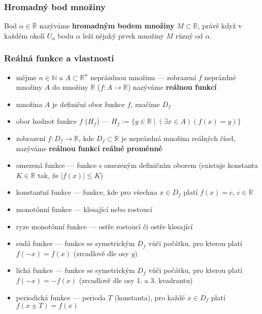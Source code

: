 \subsubsection*{Hromadný bod množiny}
Bod $\alpha \in \overline{\mathbb{R}}$ nazýváme \textbf{hromadným bodem množiny} $M \subset \mathbb{R}$, právě když v každém okolí $U_\alpha$ bodu $\alpha$ leží nějaký prvek množiny $M$ různý od $\alpha$.

\subsubsection*{Reálná funkce a vlastnosti}
\begin{itemize}
	\item mějme $n \in \mathbb{N}$ a $A \subset \mathbb{R}^n$ neprázdnou množinu --- zobrazení $f$ neprázdné množiny $A$ do množiny $\mathbb{R}$ ($f: A \rightarrow \mathbb{R}$) nazýváme \textbf{reálnou funkcí}
	\item množina $A$ je definiční obor funkce  $f$, značíme $D_f$
	\item obor hodnot funkce $f$ ($H_f$) --- $H_f:= \{y \in \mathbb{R} \mid (\exists x \in A)(f(x) = y)\}$
	\item zobrazení $f: D_f \rightarrow \mathbb{R}$, kde $D_f \subset \mathbb{R}$ je neprázdná množina reálných čísel, nazýváme \textbf{reálnou funkcí reálné proměnné}
	\item omezená funkce --- funkce s omezeným definičním oborem (existuje konstanta $K \in \mathbb{R}$ tak, že $|f(x)| \leq K$)
	\item konstantní funkce --- funkce, kde pro všechna $x \in D_f$ platí $f(x) = c$, $c \in \mathbb{R}$
	\item monotónní funkce --- klesající nebo rostoucí
	\item ryze monotónní funkce --- ostře rostoucí či ostře klesající
	\item sudá funkce --- funkce se symetrickým $D_f$ vůči počátku, pro kterou platí $f(-x) = f(x)$ (zrcadlově dle osy $y$)
	\item lichá funkce --- funkce se symetrickým $D_f$ vůči počátku, pro kterou platí $f(-x) = -f(x)$ (zrcadlově dle osy 1. a 3. kvadrantu)
	\item periodická funkce --- perioda $T$ (konstanta), pro každé $x \in D_f$ platí $f(x \pm T) = f(x)$
\end{itemize}


